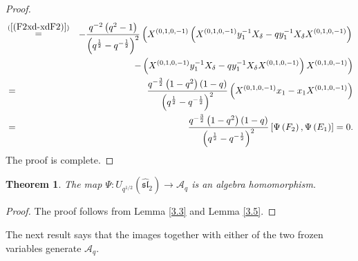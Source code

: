 \documentclass[reqno,11pt]{amsart}
\numberwithin{equation}{section}
\newtheorem{theorem}{Theorem}[section]
\begin{document}
\begin{proof}
\begin{eqnarray*}
	&\mathop  = \limits^{(\ref{(F2xd-xdF2)})} & -\frac{q^{-2}\left(q^2-1\right)}{\left(q^{\frac{1}{2}}-q^{-\frac{1}{2}}\right)^2}\left(X^{(0,1,0,-1)}\left(X^{(0,1,0,-1)} y_1^{-1} X_\delta-q y_1^{-1} X_\delta X^{(0,1,0,-1)}\right)\right. \\
	&	& \left.-\left(X^{(0,1,0,-1)} y_1^{-1} X_\delta-q y_1^{-1} X_\delta X^{(0,1,0,-1)}\right) X^{(0,1,0,-1)}\right)\\
	&	=&\frac{q^{-\frac{3}{2}}\left(1-q^2\right)(1-q)}{\left(q^{\frac{1}{2}}-q^{-\frac{1}{2}}\right)^2}\left(X^{(0,1,0,-1)} x_1-x_1 X^{(0,1,0,-1)}\right)\\
	&=&\frac{q^{-\frac{3}{2}}\left(1-q^2\right)(1-q)}{\left(q^{\frac{1}{2}}-q^{-\frac{1}{2}}\right)^2}\left[\Psi\left(F_2\right), \Psi\left(E_1\right)\right]=0 .
\end{eqnarray*}	\endgroup
The proof is complete.
\end{proof}


\begin{theorem}\label{3.6}
	 The map $\Psi: U_{q^{1/2}}(\widehat{\mathfrak{s l}}_2) \longrightarrow \mathcal{A}_q$ is an algebra homomorphism.
\end{theorem}
\begin{proof}
	 The proof follows from Lemma \ref{3.3} and Lemma \ref{3.5}.
\end{proof}

The next result says that the images together with either of the two frozen variables generate $\mathcal A_q$.
\end{document}
